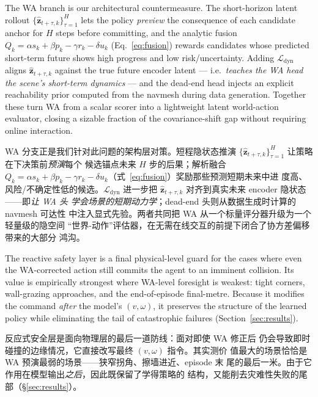\documentclass[11pt,a4paper]{article}
\newcommand{\en}[1]{\par\noindent #1\par\vspace{0.15em}}
\newcommand{\zh}[1]{\par\noindent\color{zhcol}\hspace{0.5em}#1\par\color{black}\vspace{0.6em}}
\newcommand{\bz}{\mathbf{z}}
\begin{document}
\en{The WA branch is our architectural countermeasure. The short-horizon
latent rollout $\{\hat{\bz}_{t+\tau,k}\}_{\tau=1}^{H}$ lets the policy
\emph{preview} the consequence of each candidate anchor for $H$ steps
before committing, and the analytic fusion $Q_k = \alpha s_k + \beta p_k
- \gamma r_k - \delta u_k$ (Eq.~\ref{eq:fusion}) rewards candidates whose
predicted short-term future shows high progress and low risk/uncertainty.
Adding $\mathcal{L}_{\mathrm{dyn}}$ aligns $\hat{\bz}_{t+\tau,k}$ against
the true future encoder latent — i.e.\ \emph{teaches the WA head the
scene's short-term dynamics} — and the dead-end head injects an explicit
reachability prior computed from the navmesh during data generation.
Together these turn WA from a scalar scorer into a lightweight latent
world-action evaluator, closing a sizable fraction of the
covariance-shift gap without requiring online interaction.}

\zh{\textsf{WA 分支正是我们针对此问题的架构层对策。短程隐状态推演
$\{\hat{\bz}_{t+\tau,k}\}_{\tau=1}^{H}$ 让策略在下决策前\emph{预演}每个
候选锚点未来 $H$ 步的后果；解析融合 $Q_k = \alpha s_k + \beta p_k -
\gamma r_k - \delta u_k$（式~\ref{eq:fusion}）奖励那些预测短期未来中进
度高、风险/不确定性低的候选。$\mathcal{L}_{\mathrm{dyn}}$ 进一步把
$\hat{\bz}_{t+\tau,k}$ 对齐到真实未来 encoder 隐状态——即\emph{让 WA 头
学会场景的短期动力学}；dead-end 头则从数据生成时计算的 navmesh 可达性
中注入显式先验。两者共同把 WA 从一个标量评分器升级为一个轻量级的隐空间
“世界-动作”评估器，在无需在线交互的前提下闭合了协方差偏移带来的大部分
鸿沟。}}

\en{The reactive safety layer is a final physical-level guard for the
cases where even the WA-corrected action still commits the agent to an
imminent collision. Its value is empirically strongest where WA-level
foresight is weakest: tight corners, wall-grazing approaches, and the
end-of-episode final-metre. Because it modifies the command
\emph{after} the model's $(v,\omega)$, it preserves the structure of
the learned policy while eliminating the tail of catastrophic failures
(Section~\ref{sec:results}).}

\zh{\textsf{反应式安全层是面向物理层的最后一道防线：面对即使 WA 修正后
仍会导致即时碰撞的边缘情况，它直接改写最终 $(v,\omega)$ 指令。其实测价
值最大的场景恰恰是 WA 预演最弱的场景——狭窄拐角、擦墙进近、episode 末
尾的最后一米。由于它作用在模型输出\emph{之后}，因此既保留了学得策略的
结构，又能削去灾难性失败的尾部（\S\ref{sec:results}）。}}
\end{document}
